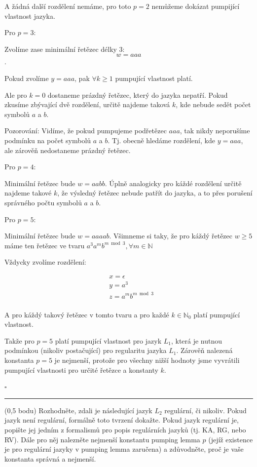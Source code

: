 \documentclass[10pt]{article}
\begin{document}
\begin{description}
A žádná další rozdělení nemáme, pro toto $p = 2$ nemůžeme dokázat pumpijící vlastnost jazyka.

Pro $p = 3$:

Zvolíme zase minimální řetězec délky 3: $$w = aaa$$.

Pokud zvolíme $y = aaa$, pak $\forall k \geq 1$ pumpující vlastnost platí.

Ale pro $k=0$ dostaneme prázdný řetězec, který do jazyka nepatří. Pokud zkusíme zbývající dvě rozdělení, určitě najdeme taková $k$, kde nebude sedět počet symbolů $a$ a $b$.


Pozorování: Vidíme, že pokud pumpujeme podřetězec $aaa$, tak nikdy neporušíme podmínku na počet symbolů $a$ a $b$. Tj. obecně hledáme rozdělení, kde $y = aaa$, ale zárověň nedostaneme prázdný řetězec.

Pro $p=4$:

Minimální řetězec bude $w = aabb$. Úplně analogicky pro káždé rozdělení určitě najdeme takové $k$, že výsledný řetězec nebude patřít do jazyka, a to přes porušení správného počtu symbolů $a$ a $b$.

Pro $p=5$:

Minimální řetězec bude $w = aaaab$. Všimneme si taky, že pro káždý řetězec $w \geq 5$ máme ten řetězec ve tvaru $a^{3}a^{m}b^{m\bmod 3}, \forall m \in \mathbb{N}$

Vždycky zvolíme rozdělení:

\begin{align*}
& x = \epsilon \\
& y = a^{3} \\
& z = a^{m}b^{m\bmod 3} \\
\end{align*}

A pro káždý takový řetězec v tomto tvaru a pro každé $k \in \mathbb{N}_{0}$ platí pumpující vlastnost.

Takže pro $p = 5$ platí pumpující vlastnost pro jazyk $L_1$, která je nutnou podmínkou (nikoliv postačující) pro regularitu jazyka $L_1$. Zárověň nalezená konstanta $p = 5$ je nejmenší, protože pro všechny nižší hodnoty jsme vyvrátili pumpující vlastnosti pro určité řetězce a konstanty $k$.


\hfill $\square$

\end{description}

\noindent\rule{\textwidth}{0.4pt}
\vskip 0.3cm

\noindent
(0,5 bodu) Rozhodněte, zdali je následující jazyk $L_2$ regulární, či nikoliv. Pokud jazyk není regulární, formálně toto tvrzení dokažte. Pokud jazyk regulární je, popište jej jedním z formalismů pro popis regulárních jazyků (tj. KA, RG, nebo RV). Dále pro něj nalezněte nejmenší konstantu pumping lemma $p$ (jejíž existence je pro regulární jazyky v pumping lemma zaručena) a zdůvodněte, proč je vaše konstanta správná a nejmenší.
\end{document}
